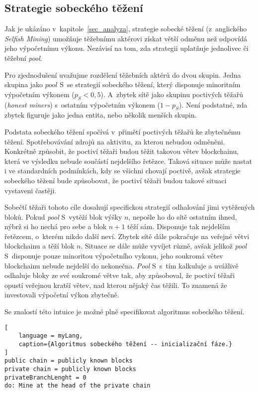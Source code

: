 
\subsection{Strategie sobeckého těžení}
\label{sec_model_selfish_mining}

Jak je ukázáno v~kapitole~\ref{sec_analyza}, strategie sobecké těžení (z~anglického \textit{Selfish Mining}) umožňuje těžebnímu aktérovi získat větší odměnu než odpovídá jeho výpočetnímu výkonu. Nezávisí na tom, zda strategii uplatňuje jednolivec či těžební \textit{pool}.

Pro zjednodušení uvažujme rozdělení těžebních aktérů do dvou skupin. Jedna skupina jako $pool$ S~se strategií sobeckého těžení, který disponuje minoritním výpočetním výkonem ($p_S < 0,5$). A~zbytek sítě jako skupinu poctivých těžařů (\textit{honest miners}) s~ostatním  výpočetním výkonem ($1 - p_S$). Není podstatné, zda zbytek figuruje jako jedna entita, nebo několik menších skupin.

Podstata sobeckého těžení spočívá v~přimětí poctivých těžařů ke zbytečnému těžení. Spotřebovávání zdrojů na aktivitu, za kterou nebudou odměněni. Konkrétně způsobit, že poctiví těžaři budou těžit takovou větev blockchainu, která ve výsledku nebude součástí nejdelšího řetězce. Taková situace může nastat i ve standardních podmínkách, kdy se všichni chovají poctivě, avšak strategie sobeckého těžení bude způsobovat, že poctiví těžaři budou takové situaci vystaveni častěji.

Sobečtí těžaři tohoto cíle dosahují specifickou strategií odhalování jimi vytěžených bloků. Pokud \textit{pool} S~vytěží blok výšky $n$, nepošle ho do sítě ostatním ihned, nýbrž si ho nechá pro sebe a blok $n + 1$ těží sám. Disponuje tak nejdelším řetězcem, o~kterém nikdo další neví. Zbytek sítě dále pokračuje na veřejné větvi blockchainu a těží blok $n$. Situace se dále může vyvíjet různě, avšak jelikož \textit{pool} S~disponuje pouze minoritou výpočetního vykonu, jeho soukromá větev blockchainu nebude nejdelší do nekonečna. \textit{Pool} S~s~tím kalkuluje a uvážlivě odhaluje bloky ze své soukromé větve tak, aby způsoboval, že poctiví těžaři opustí veřejnou kratší větev, nad kterou nějaký čas těžili. To znamená že investovali výpočetní výkon zbytečně.

Se znalostí této intuice je možné plně specifikovat algoritmus sobeckého těžení.

\bigskip
\begin{lstlisting}[
    language = myLang,
    caption={Algoritmus sobeckého těžení -- inicializační fáze.}
]
public chain = publicly known blocks
private chain = publicly known blocks
privateBranchLenght = 0
do: Mine at the head of the private chain
\end{lstlisting}

